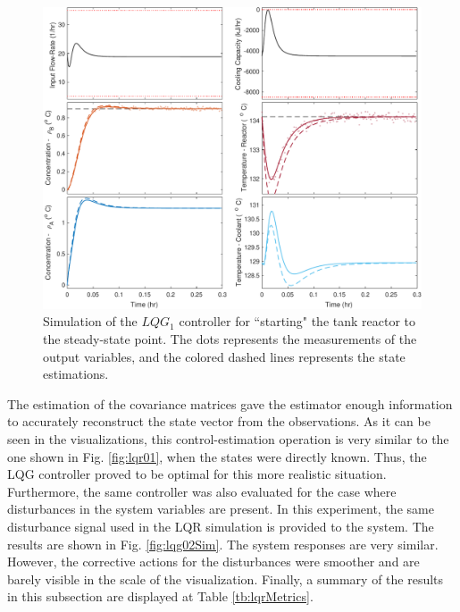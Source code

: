 \documentclass[a4paper,11pt]{book}
\numberwithin{figure}{chapter}
\numberwithin{equation}{chapter}
\numberwithin{table}{chapter}
\theoremstyle{definition}
\begin{document}
\begin{figure}[ht] \centering
	\includegraphics[width=\textwidth]{chapter7/lqg01}
	\caption{Simulation of the $LQG_1$ controller for ``starting" the tank reactor to the steady-state point. The dots represents the measurements of the output variables, and the colored dashed lines represents the state estimations.}
	\label{fig:lqg01Sim}
\end{figure}

The estimation of the covariance matrices gave the estimator enough information to accurately reconstruct the state vector from the observations. As it can be seen in the visualizations, this control-estimation operation is very similar to the one shown in Fig. \ref{fig:lqr01}, when the states were directly known. Thus, the LQG controller proved to be optimal for this more realistic situation. Furthermore, the same controller was also evaluated for the case where disturbances in the system variables are present. In this experiment, the same disturbance signal used in the LQR simulation is provided to the system. The results are shown in Fig. \ref{fig:lqg02Sim}. The system responses are very similar. However, the corrective actions for the disturbances were smoother and are barely visible in the scale of the visualization. Finally, a summary of the results in this subsection are displayed at Table \ref{tb:lqrMetrics}.
\end{document}
